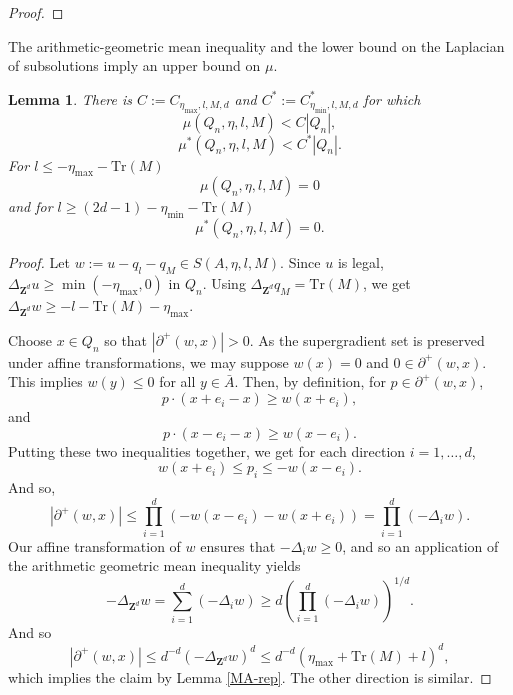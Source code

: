 \documentclass[12pt]{amsart}
\newcommand{\Z}{\mathbf{Z}}
\newtheorem{lemma}[theorem]{Lemma}
\begin{document}
\begin{proof}
\end{proof}


The arithmetic-geometric mean inequality and the lower bound on the Laplacian of subsolutions imply an upper bound on $\mu$. 
\begin{lemma} \label{mu-is-bounded}
There is $C := C_{ \eta_{\max}, l, M, d}$ and $C^* := C_{\eta_{\min}, l, M, d}^*$  for which 
\[
\mu(Q_n, \eta, l ,M) < C |Q_n| ,
\]
\[
\mu^*(Q_n, \eta, l ,M) < C^* |Q_n|.
\]
For $l \leq -\eta_{\max} - \mbox{Tr}(M)$
\[
\mu(Q_n, \eta, l , M) = 0 
\]
and for $l \geq (2 d-1) - \eta_{\min} - \mbox{Tr}(M)$
\[
\mu^*(Q_n, \eta, l, M) = 0. 
\]

\end{lemma}

\begin{proof}



Let $w := u - q_l - q_M \in S(A, \eta, l, M)$. Since $u$ is legal,  $\Delta_{\Z^d} u \geq \min(-\eta_{\max},0)$ in $Q_n$. 
Using $\Delta_{\Z^d} q_M = \mbox{Tr}(M)$, we get $\Delta_{\Z^d} w \geq  - l - \mbox{Tr}(M) -\eta_{\max}$.  

Choose $x \in Q_n$ so that  $|\partial^+(w, x)| > 0$. As the supergradient set is preserved under affine transformations, we may suppose $w(x) = 0$ and $0 \in \partial^+(w, x)$. 
 This implies $w(y) \leq 0$ for all $y \in \bar{A}$. Then, by definition, for $p \in \partial^+(w,x)$, 
\[
p \cdot(x + e_i - x)  \geq w(x+e_i),
\]
and
\[
p \cdot( x - e_i - x) \geq w(x-e_i). 
\]
Putting these two inequalities together, we get for each direction $i = 1, \ldots, d$, 
\begin{equation} \label{discreteMA1}
w(x+e_i)  \leq p_i \leq - w(x-e_i). 
\end{equation}
And so, 
\[
|\partial^+(w,x)| \leq \prod_{i=1}^d \left(- w(x-e_i) - w(x+e_i) \right) = \prod_{i=1}^d (- \Delta_i w).
\]
Our affine transformation of $w$ ensures that $-\Delta_i w \geq 0$, and so an application of the arithmetic geometric mean inequality yields
\[
- \Delta_{\Z^d} w = \sum_{i=1}^d (-\Delta_i w) \geq d \left( \prod_{i=1}^d (-\Delta_i w) \right)^{1/d}.
\]
And so
\begin{equation}
|\partial^+(w,x)|  \leq  d^{-d} (-\Delta_{\Z^d} w)^d \leq  d^{-d} (\eta_{\max} + \mbox{Tr}(M) + l)^d, 
\end{equation}
which implies the claim by Lemma \ref{MA-rep}. The other direction is similar. 






\end{proof}
\end{document}
